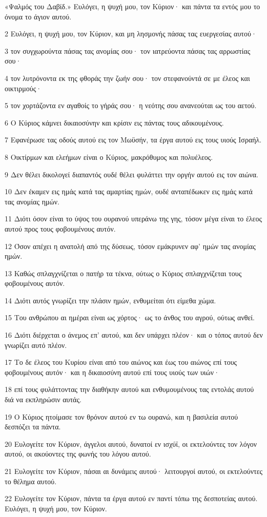 \par «Ψαλμός του Δαβίδ.» Ευλόγει, η ψυχή μου, τον Κύριον· και πάντα τα εντός μου το όνομα το άγιον αυτού.
\par 2 Ευλόγει, η ψυχή μου, τον Κύριον, και μη λησμονής πάσας τας ευεργεσίας αυτού·
\par 3 τον συγχωρούντα πάσας τας ανομίας σου· τον ιατρεύοντα πάσας τας αρρωστίας σου·
\par 4 τον λυτρόνοντα εκ της φθοράς την ζωήν σου· τον στεφανούντά σε με έλεος και οικτιρμούς·
\par 5 τον χορτάζοντα εν αγαθοίς το γήράς σου· η νεότης σου ανανεούται ως του αετού.
\par 6 Ο Κύριος κάμνει δικαιοσύνην και κρίσιν εις πάντας τους αδικουμένους.
\par 7 Εφανέρωσε τας οδούς αυτού εις τον Μωϋσήν, τα έργα αυτού εις τους υιούς Ισραήλ.
\par 8 Οικτίρμων και ελεήμων είναι ο Κύριος, μακρόθυμος και πολυέλεος.
\par 9 Δεν θέλει δικολογεί διαπαντός ουδέ θέλει φυλάττει την οργήν αυτού εις τον αιώνα.
\par 10 Δεν έκαμεν εις ημάς κατά τας αμαρτίας ημών, ουδέ ανταπέδωκεν εις ημάς κατά τας ανομίας ημών.
\par 11 Διότι όσον είναι το ύψος του ουρανού υπεράνω της γης, τόσον μέγα είναι το έλεος αυτού προς τους φοβουμένους αυτόν.
\par 12 Όσον απέχει η ανατολή από της δύσεως, τόσον εμάκρυνεν αφ' ημών τας ανομίας ημών.
\par 13 Καθώς σπλαγχνίζεται ο πατήρ τα τέκνα, ούτως ο Κύριος σπλαγχνίζεται τους φοβουμένους αυτόν.
\par 14 Διότι αυτός γνωρίζει την πλάσιν ημών, ενθυμείται ότι είμεθα χώμα.
\par 15 Του ανθρώπου αι ημέραι είναι ως χόρτος· ως το άνθος του αγρού, ούτως ανθεί.
\par 16 Διότι διέρχεται ο άνεμος επ' αυτού, και δεν υπάρχει πλέον· και ο τόπος αυτού δεν γνωρίζει αυτό πλέον.
\par 17 Το δε έλεος του Κυρίου είναι από του αιώνος και έως του αιώνος επί τους φοβουμένους αυτόν· και η δικαιοσύνη αυτού επί τους υιούς των υιών·
\par 18 επί τους φυλάττοντας την διαθήκην αυτού και ενθυμουμένους τας εντολάς αυτού διά να εκπληρώσιν αυτάς.
\par 19 Ο Κύριος ητοίμασε τον θρόνον αυτού εν τω ουρανώ, και η βασιλεία αυτού δεσπόζει τα πάντα.
\par 20 Ευλογείτε τον Κύριον, άγγελοι αυτού, δυνατοί εν ισχύϊ, οι εκτελούντες τον λόγον αυτού, οι ακούοντες της φωνής του λόγου αυτού.
\par 21 Ευλογείτε τον Κύριον, πάσαι αι δυνάμεις αυτού· λειτουργοί αυτού, οι εκτελούντες το θέλημα αυτού.
\par 22 Ευλογείτε τον Κύριον, πάντα τα έργα αυτού εν παντί τόπω της δεσποτείας αυτού. Ευλόγει, η ψυχή μου, τον Κύριον.

